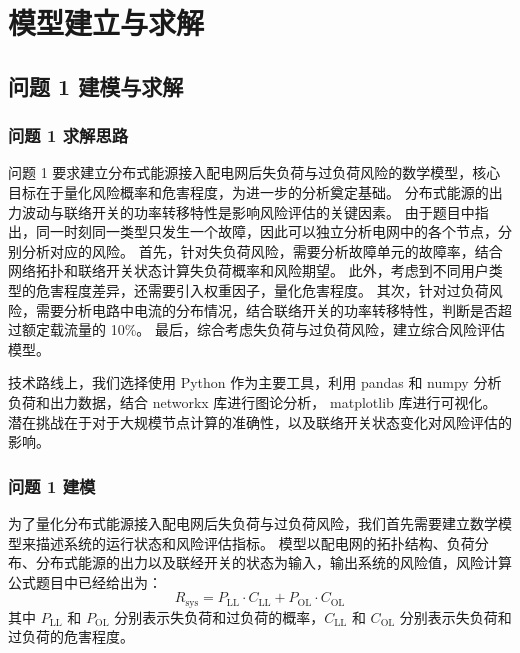 \documentclass{article}
\begin{document}
\section{模型建立与求解}\label{sec:model}

\subsection{问题 1 建模与求解}\label{subsec:problem1}

\subsubsection{问题 1 求解思路}\label{subsubsec:problem1_idea}

问题 1 要求建立分布式能源接入配电网后失负荷与过负荷风险的数学模型，核心目标在于量化风险概率和危害程度，为进一步的分析奠定基础。
分布式能源的出力波动与联络开关的功率转移特性是影响风险评估的关键因素。
由于题目中指出，同一时刻同一类型只发生一个故障，因此可以独立分析电网中的各个节点，分别分析对应的风险。
首先，针对失负荷风险，需要分析故障单元的故障率，结合网络拓扑和联络开关状态计算失负荷概率和风险期望。
此外，考虑到不同用户类型的危害程度差异，还需要引入权重因子，量化危害程度。
其次，针对过负荷风险，需要分析电路中电流的分布情况，结合联络开关的功率转移特性，判断是否超过额定载流量的 10\%。
最后，综合考虑失负荷与过负荷风险，建立综合风险评估模型。

技术路线上，我们选择使用 Python 作为主要工具，利用 pandas 和 numpy 分析负荷和出力数据，结合 networkx 库进行图论分析， matplotlib 库进行可视化。
潜在挑战在于对于大规模节点计算的准确性，以及联络开关状态变化对风险评估的影响。

\subsubsection{问题 1 建模}\label{subsubsec:problem1_model}

为了量化分布式能源接入配电网后失负荷与过负荷风险，我们首先需要建立数学模型来描述系统的运行状态和风险评估指标。
模型以配电网的拓扑结构、负荷分布、分布式能源的出力以及联经开关的状态为输入，输出系统的风险值，风险计算公式题目中已经给出为：
\begin{equation}\label{eq:risk_formula}
  R_{\text{sys}} = P_{\text{LL}} \cdot C_{\text{LL}} + P_{\text{OL}} \cdot C_{\text{OL}}
\end{equation}
其中 $P_{\text{LL}}$ 和 $P_{\text{OL}}$ 分别表示失负荷和过负荷的概率，$C_{\text{LL}}$ 和 $C_{\text{OL}}$ 分别表示失负荷和过负荷的危害程度。
\end{document}
